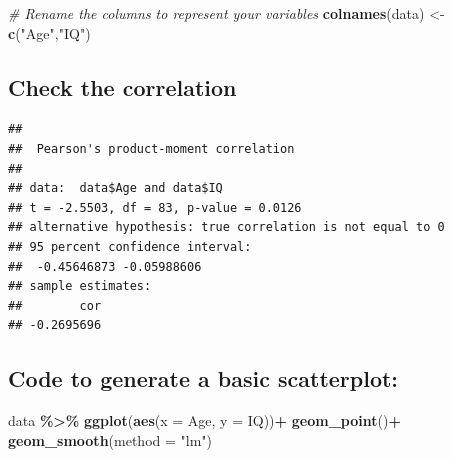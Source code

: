 \documentclass[
]{book}
\newenvironment{Shaded}{\begin{snugshade}}{\end{snugshade}}
\newcommand{\AttributeTok}[1]{\textcolor[rgb]{0.13,0.29,0.53}{#1}}
\newcommand{\CommentTok}[1]{\textcolor[rgb]{0.56,0.35,0.01}{\textit{#1}}}
\newcommand{\FunctionTok}[1]{\textcolor[rgb]{0.13,0.29,0.53}{\textbf{#1}}}
\newcommand{\NormalTok}[1]{#1}
\newcommand{\OtherTok}[1]{\textcolor[rgb]{0.56,0.35,0.01}{#1}}
\newcommand{\SpecialCharTok}[1]{\textcolor[rgb]{0.81,0.36,0.00}{\textbf{#1}}}
\newcommand{\StringTok}[1]{\textcolor[rgb]{0.31,0.60,0.02}{#1}}
\begin{document}
\begin{Shaded}
\begin{Highlighting}[]
\CommentTok{\# Rename the columns to represent your variables }
\FunctionTok{colnames}\NormalTok{(data) }\OtherTok{\textless{}{-}} \FunctionTok{c}\NormalTok{(}\StringTok{"Age"}\NormalTok{,}\StringTok{"IQ"}\NormalTok{)}
\end{Highlighting}
\end{Shaded}

\subsection*{Check the correlation}\label{check-the-correlation}

\begin{Shaded}
\end{Shaded}

\begin{verbatim}
## 
##  Pearson's product-moment correlation
## 
## data:  data$Age and data$IQ
## t = -2.5503, df = 83, p-value = 0.0126
## alternative hypothesis: true correlation is not equal to 0
## 95 percent confidence interval:
##  -0.45646873 -0.05988606
## sample estimates:
##        cor 
## -0.2695696
\end{verbatim}

\subsection*{Code to generate a basic scatterplot:}\label{code-to-generate-a-basic-scatterplot}

\begin{Shaded}
\begin{Highlighting}[]
\NormalTok{data }\SpecialCharTok{\%\textgreater{}\%}
  \FunctionTok{ggplot}\NormalTok{(}\FunctionTok{aes}\NormalTok{(}\AttributeTok{x =}\NormalTok{ Age, }\AttributeTok{y =}\NormalTok{ IQ))}\SpecialCharTok{+}
  \FunctionTok{geom\_point}\NormalTok{()}\SpecialCharTok{+}
  \FunctionTok{geom\_smooth}\NormalTok{(}\AttributeTok{method =} \StringTok{"lm"}\NormalTok{)}
\end{Highlighting}
\end{Shaded}
\end{document}
